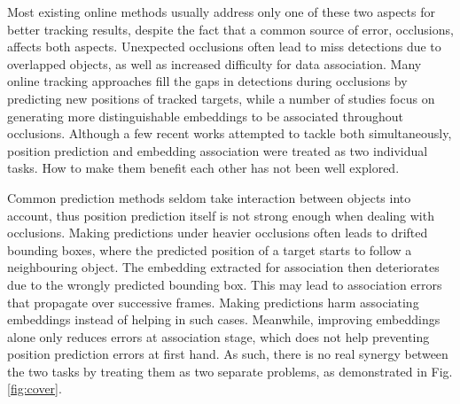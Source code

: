 \documentclass[final]{cvpr}
\begin{document}
Most existing online methods usually address only one of these two aspects for better tracking results, despite the fact that a common source of error, occlusions, affects both aspects. Unexpected occlusions often lead to miss detections due to overlapped objects, as well as increased difficulty for data association. 
Many online tracking approaches fill the gaps in detections during occlusions by predicting new positions of tracked targets, while a number of studies focus on generating more distinguishable embeddings to be associated throughout occlusions. 
Although a few recent works attempted to tackle both simultaneously, position prediction and embedding association were treated as two individual tasks.
How to make them benefit each other has not been well explored.

Common prediction methods seldom take interaction between objects into account, thus position prediction itself is not strong enough when dealing with occlusions. Making predictions under heavier occlusions often leads to drifted bounding boxes, where the predicted position of a target starts to follow a neighbouring object. The embedding extracted for association then deteriorates due to the wrongly predicted bounding box. This may lead to association errors that propagate over successive frames. Making predictions harm associating embeddings instead of helping in such cases. Meanwhile, improving embeddings alone only reduces errors at association stage, which does not help preventing position prediction errors at first hand. As such, there is no real synergy between the two tasks by treating them as two separate problems, as demonstrated in Fig. \ref{fig:cover}.
\end{document}
